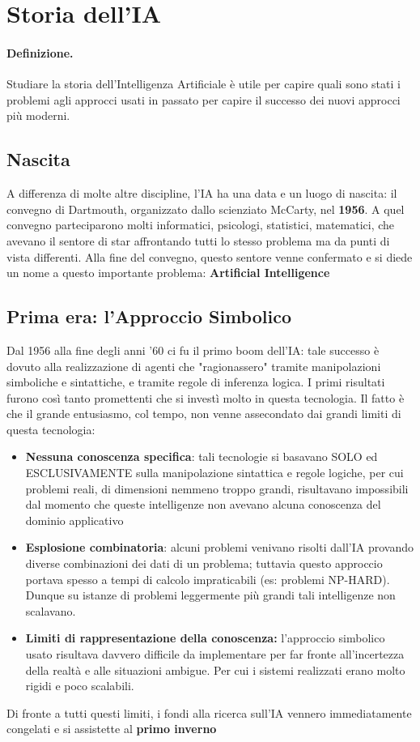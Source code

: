 \section{Storia dell'IA}
\paragraph{Definizione.}
Studiare la storia dell'Intelligenza Artificiale è utile per capire quali sono stati i 
problemi agli approcci usati in passato per capire il successo dei nuovi approcci più moderni.
\subsection{Nascita}
A differenza di molte altre discipline, l'IA ha una data e un luogo di nascita: il convegno di Dartmouth, organizzato dallo scienziato McCarty, 
nel \textbf{1956}. A quel convegno parteciparono molti informatici, psicologi, statistici, matematici, che avevano il sentore di star affrontando tutti lo stesso problema ma da punti di vista differenti.
Alla fine del convegno, questo sentore venne confermato e si diede un nome a questo importante problema: \textbf{Artificial Intelligence}

\subsection{Prima era: l'Approccio Simbolico}
Dal 1956 alla fine degli anni '60 ci fu il primo boom dell'IA: tale successo è dovuto alla realizzazione di agenti che "ragionassero" tramite manipolazioni simboliche e sintattiche, e tramite regole di inferenza logica.
I primi risultati furono così tanto promettenti che si investì molto in questa tecnologia. Il fatto è che il grande entusiasmo, col tempo, non venne assecondato dai grandi limiti di questa tecnologia:
\begin{itemize}
    \item \textbf{Nessuna conoscenza specifica}: tali tecnologie si basavano SOLO ed ESCLUSIVAMENTE sulla manipolazione sintattica e regole logiche, per cui problemi reali, 
    di dimensioni nemmeno troppo grandi, risultavano impossibili dal momento che queste intelligenze non avevano alcuna conoscenza del
    dominio applicativo
    \item \textbf{Esplosione combinatoria}: alcuni problemi venivano risolti dall'IA provando diverse combinazioni dei dati di un problema;
    tuttavia questo approccio portava spesso a tempi di calcolo impraticabili (es: problemi NP-HARD). Dunque su istanze di problemi leggermente più grandi
    tali intelligenze non scalavano.
    \item \textbf{Limiti di rappresentazione della conoscenza:} l'approccio simbolico usato risultava davvero difficile da implementare
    per far fronte all'incertezza della realtà e alle situazioni ambigue. Per cui i sistemi realizzati erano molto rigidi e poco scalabili.
\end{itemize}
Di fronte a tutti questi limiti, i fondi alla ricerca sull'IA vennero immediatamente congelati e si assistette al \textbf{primo inverno}


